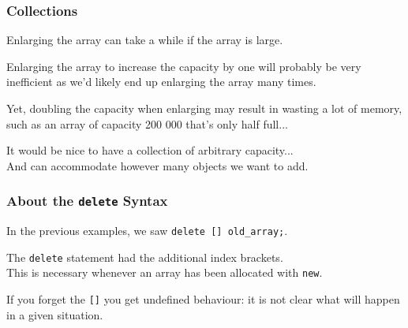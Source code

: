\begin{frame}
\frametitle{Collections}

Enlarging the array can take a while if the array is large.

Enlarging the array to increase the capacity by one will probably be very inefficient as we'd likely end up enlarging the array many times.

Yet, doubling the capacity when enlarging may result in wasting a lot of memory, such as an array of capacity 200 000 that's only half full...

It would be nice to have a \alert{collection} of arbitrary capacity...\\
\quad And can accommodate however many objects we want to add.

\end{frame}



\begin{frame}
\frametitle{About the \texttt{delete} Syntax}

In the previous examples, we saw \texttt{delete [] old\_array;}.

The \texttt{delete} statement had the additional index brackets.\\
\quad This is necessary whenever an array has been allocated with \texttt{new}.

If you forget the \texttt{[]} you get undefined behaviour: it is not clear what will happen in a given situation.


\end{frame}



